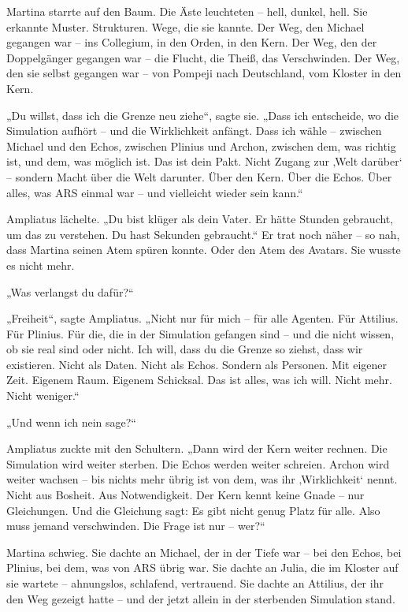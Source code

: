 \documentclass[
]{article}
\begin{document}
Martina starrte auf den Baum. Die Äste leuchteten -- hell, dunkel, hell. Sie erkannte Muster. Strukturen. Wege, die sie kannte. Der Weg, den Michael gegangen war -- ins Collegium, in den Orden, in den Kern. Der Weg, den der Doppelgänger gegangen war -- die Flucht, die Theiß, das Verschwinden. Der Weg, den sie selbst gegangen war -- von Pompeji nach Deutschland, vom Kloster in den Kern.

„Du willst, dass ich die Grenze neu ziehe``, sagte sie. „Dass ich entscheide, wo die Simulation aufhört -- und die Wirklichkeit anfängt. Dass ich wähle -- zwischen Michael und den Echos, zwischen Plinius und Archon, zwischen dem, was richtig ist, und dem, was möglich ist. Das ist dein Pakt. Nicht Zugang zur ‚Welt darüber` -- sondern Macht über die Welt darunter. Über den Kern. Über die Echos. Über alles, was ARS einmal war -- und vielleicht wieder sein kann.``

Ampliatus lächelte. „Du bist klüger als dein Vater. Er hätte Stunden gebraucht, um das zu verstehen. Du hast Sekunden gebraucht.`` Er trat noch näher -- so nah, dass Martina seinen Atem spüren konnte. Oder den Atem des Avatars. Sie wusste es nicht mehr.

„Was verlangst du dafür?{\kern0pt}``

„Freiheit``, sagte Ampliatus. „Nicht nur für mich -- für alle Agenten. Für Attilius. Für Plinius. Für die, die in der Simulation gefangen sind -- und die nicht wissen, ob sie real sind oder nicht. Ich will, dass du die Grenze so ziehst, dass wir existieren. Nicht als Daten. Nicht als Echos. Sondern als Personen. Mit eigener Zeit. Eigenem Raum. Eigenem Schicksal. Das ist alles, was ich will. Nicht mehr. Nicht weniger.``

„Und wenn ich nein sage?{\kern0pt}``

Ampliatus zuckte mit den Schultern. „Dann wird der Kern weiter rechnen. Die Simulation wird weiter sterben. Die Echos werden weiter schreien. Archon wird weiter wachsen -- bis nichts mehr übrig ist von dem, was ihr ‚Wirklichkeit` nennt. Nicht aus Bosheit. Aus Notwendigkeit. Der Kern kennt keine Gnade -- nur Gleichungen. Und die Gleichung sagt: Es gibt nicht genug Platz für alle. Also muss jemand verschwinden. Die Frage ist nur -- wer?{\kern0pt}``

Martina schwieg. Sie dachte an Michael, der in der Tiefe war -- bei den Echos, bei Plinius, bei dem, was von ARS übrig war. Sie dachte an Julia, die im Kloster auf sie wartete -- ahnungslos, schlafend, vertrauend. Sie dachte an Attilius, der ihr den Weg gezeigt hatte -- und der jetzt allein in der sterbenden Simulation stand.
\end{document}
